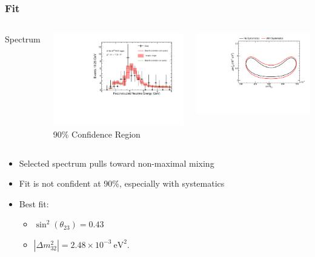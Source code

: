 \documentclass[10pt,professionalfonts,xcolor=table]{beamer}
\begin{document}
\begin{frame}
\frametitle{Fit}
\begin{columns}[c]
 \centering
 \textcolor{custom_red}{Spectrum}

  \includegraphics[angle=-90, width=1\textwidth]{figures/results/spectrum_fit_systs.pdf}
 \centering
  \textcolor{custom_red}{90\% Confidence Region}

  \includegraphics[angle=-90, width=1\textwidth]{figures/results/fd_extrap_contour_full_syst.pdf}
\end{columns}
\gap
\begin{itemize}
\item Selected spectrum pulls toward non-maximal mixing
\item Fit is not confident at 90\%, especially with systematics
\item Best fit:
  \begin{itemize}
  \item $\sin^2(\theta_{23}) = 0.43$
  \item $|\Delta m^2_{32}| = 2.48\times10^{-3}~\text{eV}^2$.
  \end{itemize}
\end{itemize}
\end{frame}
\end{document}
